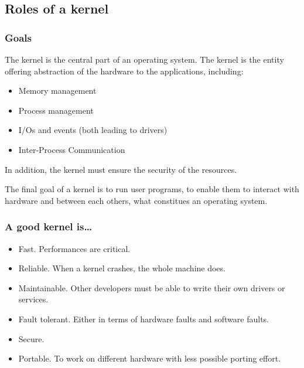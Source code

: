 \subsection{Roles of a kernel}


\begin{frame}
  \frametitle{Goals}

  The kernel is the central part of an operating system. The kernel is
  the entity offering abstraction of the hardware to the applications,
  including:

  \begin{itemize}
  \item
    Memory management
  \item
    Process management
  \item
    I/Os and events (both leading to drivers)
  \item
    Inter-Process Communication
  \end{itemize}

  In addition, the kernel must ensure the security of the resources.

  \-

  The final goal of a kernel is to run user programs, to enable them
  to interact with hardware and between each others, what constitues
  an operating system.

\end{frame}


\begin{frame}
  \frametitle{A good kernel is\ldots}

  \begin{itemize}
  \item
    Fast. Performances are critical.
  \item
    Reliable. When a kernel crashes, the whole machine does.
  \item
    Maintainable. Other developers must be able to write their own
    drivers or services.
  \item
    Fault tolerant. Either in terms of hardware faults and software
    faults.
  \item
    Secure.
  \item
    Portable. To work on different hardware with less possible porting
    effort.
  \end{itemize}

\end{frame}


